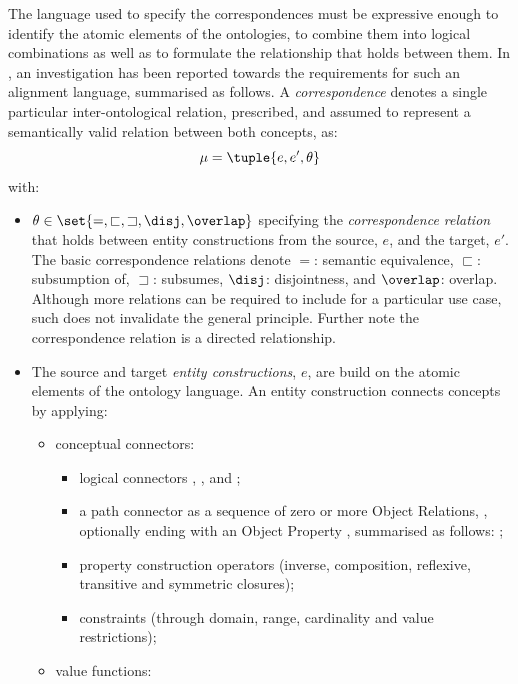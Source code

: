 \documentclass[sort&compress,preprint,authoryear,3p,twocolumn]{elsarticle}
\providecommand{\tightlist}{%
  \setlength{\itemsep}{0pt}\setlength{\parskip}{0pt}}
\begin{document}
The language used to specify the correspondences must be expressive
enough to identify the atomic elements of the ontologies, to combine
them into logical combinations as well as to formulate the relationship
that holds between them. In \citep{Euzenat2007, Scharffe2011}, an
investigation has been reported towards the requirements for such an
alignment language, summarised as follows. A \emph{correspondence}
denotes a single particular inter-ontological relation, prescribed, and
assumed to represent a semantically valid relation between both
concepts, as: \begin{equation*}\label{eq:correspondence}
\mu = \tuple{ e, e', \theta }
\end{equation*} with:

\begin{itemize}
\tightlist
\item
  \(\theta \in \set{=, \sqsubset, \sqsupset, \disj, \overlap }\)
  specifying the \emph{correspondence relation} that holds between
  entity constructions from the source, \(e\), and the target, \(e'\).
  The basic correspondence relations denote \(=\): semantic equivalence,
  \(\sqsubset\): subsumption of, \(\sqsupset\): subsumes, \(\disj\):
  disjointness, and \(\overlap\): overlap. Although more relations can
  be required to include for a particular use case, such does not
  invalidate the general principle. Further note the correspondence
  relation is a directed relationship.
\item
  The source and target \emph{entity constructions}, \(e\), are build on
  the atomic elements of the ontology language. An entity construction
  connects concepts by applying:

  \begin{itemize}
  \tightlist
  \item
    conceptual connectors:

    \begin{itemize}
    \tightlist
    \item
      logical connectors , , and ;
    \item
      a path connector as a sequence of zero or more Object Relations,
      , optionally ending with an Object Property ,
      summarised as follows: ;
    \item
      property construction operators (inverse, composition, reflexive,
      transitive and symmetric closures);
    \item
      constraints (through domain, range, cardinality and value
      restrictions);
    \end{itemize}
  \item
    value functions:


\end{itemize}
\end{itemize}
\end{document}
